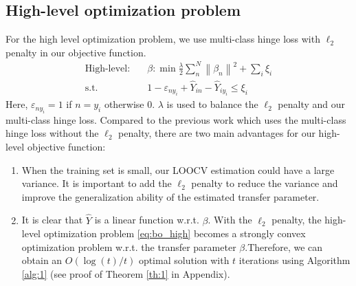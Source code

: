 \subsection{High-level optimization problem} 
For the high level optimization problem, we use multi-class hinge loss \cite{crammer2002algorithmic} with $\ell_2$ penalty in our objective function.
\begin{equation}\label{eq:bo_high}
\begin{aligned}
\text{High-level:}\quad&\beta: \min \frac{{{\lambda}}}{2}\sum\limits_{n}^N {{{\left\| {{\beta _n}} \right\|}^2}}  +
\sum_i\xi_i\\
\text{s.t.} \qquad& 1 - {\varepsilon _{n{y_i}}} + {\hat Y_{in}} - {\hat Y_{i{y_i}}} \le {\xi_i}
\end{aligned}
\end{equation}
Here, $\varepsilon _{n{y_i}}=1$ if $n=y_i$ otherwise 0.
$\lambda$ is used to balance the $\ell_2$ penalty and our multi-class hinge loss. 
Compared to the previous work \cite{kuzborskij2013n,tommasi2014learning} which uses the multi-class hinge loss without the $\ell_2$ penalty, there are two main advantages for our high-level objective function: 
\begin{enumerate}
	\item When the training set is small, our LOOCV estimation could have a large variance. It is important to add the $\ell_2$ penalty to {reduce the variance and improve the generalization ability of the estimated transfer parameter}.
	\item It is clear that $\hat{Y}$ is a linear function w.r.t. $\beta$. With the $\ell_2$ penalty, the high-level optimization problem \eqref{eq:bo_high} becomes a strongly convex optimization problem w.r.t. the transfer parameter $\beta$.Therefore, we can obtain an $O({\log(t)}/{t})$ optimal solution with $t$ iterations using Algorithm \ref{alg:1} (see proof of Theorem \ref{th:1} in Appendix).
\end{enumerate}



 